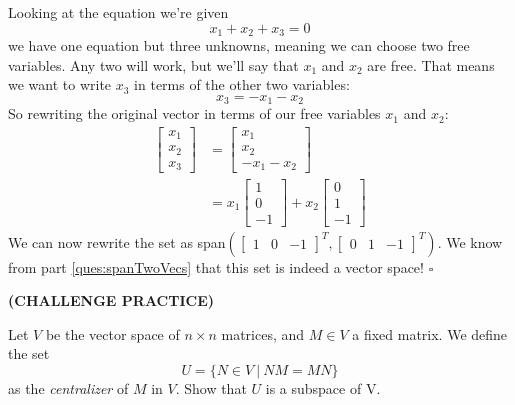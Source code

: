 \begin{enumerate}
{	Looking at the equation we're given
	$$x_1 + x_2 + x_3 = 0$$
	we have one equation but three unknowns, meaning we can choose two free variables. Any two will work, but we'll say that $x_1$ and $x_2$ are free. That means we want to write $x_3$ in terms of the other two variables:
	$$x_3 = -x_1 - x_2$$
	So rewriting the original vector in terms of our free variables $x_1$ and $x_2$:
	\begin{align*}
		\begin{bmatrix}x_1\\x_2\\x_3\end{bmatrix} &= \begin{bmatrix}x_1\\x_2\\-x_1-x_2\end{bmatrix}\\
			&= x_1\begin{bmatrix}1\\0\\-1\end{bmatrix} + x_2\begin{bmatrix}0\\1\\-1\end{bmatrix}
	\end{align*}
	We can now rewrite the set as span$\left(\begin{bmatrix}1&0&-1\end{bmatrix}^T, \begin{bmatrix}0&1&-1\end{bmatrix}^T\right)$. We know from part \ref{ques:spanTwoVecs} that this set is indeed a vector space! $\square$
}

\qitem\label{ques:matrixSpace}{
	\textbf{(CHALLENGE PRACTICE)}

	Let $V$ be the vector space of $n\times n$ matrices, and $M \in V$ a fixed matrix. We define the set $$U = \{N \in V \: | \: NM = MN \}$$ as the \textit{centralizer} of $M$ in $V$. Show that $U$ is a subspace of V.
}



\end{enumerate}
